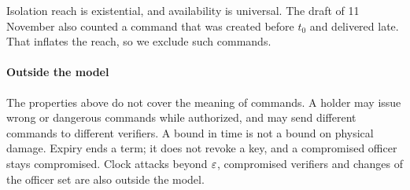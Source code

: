 Isolation reach is existential, and availability is universal. The draft of 11 November
also counted a command that was created before $t_0$ and delivered late. That inflates
the reach, so we exclude such commands.

\paragraph{Outside the model}
The properties above do not cover the meaning of commands. A holder may issue wrong or
dangerous commands while authorized, and may send different commands to different
verifiers. A bound in time is not a bound on physical damage. Expiry ends a term; it
does not revoke a key, and a compromised officer stays compromised. Clock attacks beyond
$\varepsilon$, compromised verifiers and changes of the officer set are also outside the model.

